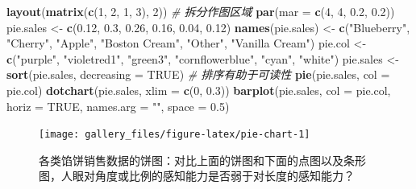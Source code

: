 \documentclass[
  b5paper,
  UTF8,twoside]{book}
\newenvironment{Shaded}{\begin{snugshade}}{\end{snugshade}}
\newcommand{\AttributeTok}[1]{\textcolor[rgb]{0.13,0.29,0.53}{#1}}
\newcommand{\CommentTok}[1]{\textcolor[rgb]{0.56,0.35,0.01}{\textit{#1}}}
\newcommand{\ConstantTok}[1]{\textcolor[rgb]{0.56,0.35,0.01}{#1}}
\newcommand{\DecValTok}[1]{\textcolor[rgb]{0.00,0.00,0.81}{#1}}
\newcommand{\FloatTok}[1]{\textcolor[rgb]{0.00,0.00,0.81}{#1}}
\newcommand{\FunctionTok}[1]{\textcolor[rgb]{0.13,0.29,0.53}{\textbf{#1}}}
\newcommand{\NormalTok}[1]{#1}
\newcommand{\OtherTok}[1]{\textcolor[rgb]{0.56,0.35,0.01}{#1}}
\newcommand{\StringTok}[1]{\textcolor[rgb]{0.31,0.60,0.02}{#1}}
\begin{document}
\begin{Shaded}
\begin{Highlighting}[]
\FunctionTok{layout}\NormalTok{(}\FunctionTok{matrix}\NormalTok{(}\FunctionTok{c}\NormalTok{(}\DecValTok{1}\NormalTok{, }\DecValTok{2}\NormalTok{, }\DecValTok{1}\NormalTok{, }\DecValTok{3}\NormalTok{), }\DecValTok{2}\NormalTok{)) }\CommentTok{\# 拆分作图区域}
\FunctionTok{par}\NormalTok{(}\AttributeTok{mar =} \FunctionTok{c}\NormalTok{(}\DecValTok{4}\NormalTok{, }\DecValTok{4}\NormalTok{, }\FloatTok{0.2}\NormalTok{, }\FloatTok{0.2}\NormalTok{))}
\NormalTok{pie.sales }\OtherTok{\textless{}{-}} \FunctionTok{c}\NormalTok{(}\FloatTok{0.12}\NormalTok{, }\FloatTok{0.3}\NormalTok{, }\FloatTok{0.26}\NormalTok{, }\FloatTok{0.16}\NormalTok{, }\FloatTok{0.04}\NormalTok{, }\FloatTok{0.12}\NormalTok{)}
\FunctionTok{names}\NormalTok{(pie.sales) }\OtherTok{\textless{}{-}} \FunctionTok{c}\NormalTok{(}\StringTok{"Blueberry"}\NormalTok{, }\StringTok{"Cherry"}\NormalTok{, }\StringTok{"Apple"}\NormalTok{,}
                      \StringTok{"Boston Cream"}\NormalTok{, }\StringTok{"Other"}\NormalTok{, }\StringTok{"Vanilla Cream"}\NormalTok{)}
\NormalTok{pie.col }\OtherTok{\textless{}{-}} \FunctionTok{c}\NormalTok{(}\StringTok{"purple"}\NormalTok{, }\StringTok{"violetred1"}\NormalTok{, }\StringTok{"green3"}\NormalTok{, }\StringTok{"cornflowerblue"}\NormalTok{, }\StringTok{"cyan"}\NormalTok{, }\StringTok{"white"}\NormalTok{)}
\NormalTok{pie.sales }\OtherTok{\textless{}{-}} \FunctionTok{sort}\NormalTok{(pie.sales, }\AttributeTok{decreasing =} \ConstantTok{TRUE}\NormalTok{) }\CommentTok{\# 排序有助于可读性}
\FunctionTok{pie}\NormalTok{(pie.sales, }\AttributeTok{col =}\NormalTok{ pie.col)}
\FunctionTok{dotchart}\NormalTok{(pie.sales, }\AttributeTok{xlim =} \FunctionTok{c}\NormalTok{(}\DecValTok{0}\NormalTok{, }\FloatTok{0.3}\NormalTok{))}
\FunctionTok{barplot}\NormalTok{(pie.sales, }\AttributeTok{col =}\NormalTok{ pie.col, }\AttributeTok{horiz =} \ConstantTok{TRUE}\NormalTok{, }\AttributeTok{names.arg =} \StringTok{""}\NormalTok{, }\AttributeTok{space =} \FloatTok{0.5}\NormalTok{)}
\end{Highlighting}
\end{Shaded}

\begin{figure}

{\centering \texttt{[image: gallery\_files/figure-latex/pie-chart-1]} 

}

\caption[各类馅饼销售数据的饼图]{各类馅饼销售数据的饼图：对比上面的饼图和下面的点图以及条形图，人眼对角度或比例的感知能力是否弱于对长度的感知能力？}\label{fig:pie-chart}
\end{figure}
\end{document}
